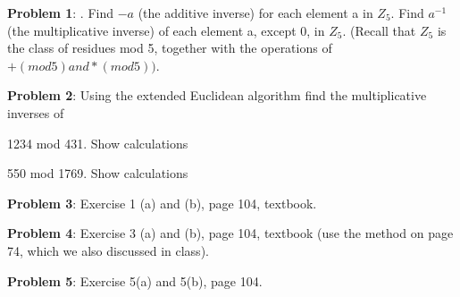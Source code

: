 \documentclass[12pt,letterpaper,final]{report}
\begin{document}

\vline


\noindent\textbf{Problem 1}: . Find $-a$ (the additive inverse) for each element a in $Z_{5}$.  Find $a^{-1}$   (the multiplicative inverse) of each element a, except 0, in $Z_{5}$. 
(Recall that $Z_{5}$   is the class of residues mod 5, together with the operations of $+ (mod 5) and * (mod 5))$.
 

\bigskip
\noindent\textbf{Problem 2}: Using the extended Euclidean algorithm find the multiplicative inverses of

\begin{alphalist}
	\item 1234 mod 431. Show calculations
	\item 550 mod 1769. Show calculations
	
\end{alphalist}

\bigskip
\noindent\textbf{Problem 3}: Exercise 1 (a) and (b), page 104, textbook.


\bigskip
\noindent\textbf{Problem 4}: Exercise 3 (a) and (b), page 104, textbook (use the method on page 74, which we also discussed in class).


\bigskip
\noindent\textbf{Problem 5}: Exercise 5(a) and 5(b), page 104.
\end{document}
